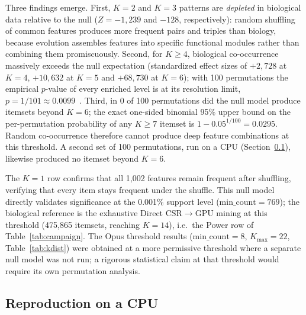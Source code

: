 \documentclass[10pt,a4paper,twocolumn]{article}
\begin{document}
Three findings emerge. First, $K{=}2$ and $K{=}3$ patterns are \emph{depleted} in biological data relative to the null ($Z{=}{-}1{,}239$ and ${-}128$, respectively): random shuffling of common features produces more frequent pairs and triples than biology, because evolution assembles features into specific functional modules rather than combining them promiscuously. Second, for $K{\geq}4$, biological co-occurrence massively exceeds the null expectation (standardized effect sizes of $+2{,}728$ at $K{=}4$, $+10{,}632$ at $K{=}5$ and $+68{,}730$ at $K{=}6$); with 100 permutations the empirical $p$-value of every enriched level is at its resolution limit, $p{=}1/101{\approx}0.0099$~\cite{phipson2010}. Third, in 0 of 100 permutations did the null model produce itemsets beyond $K{=}6$; the exact one-sided binomial 95\% upper bound on the per-permutation probability of any $K{\geq}7$ itemset is $1-0.05^{1/100}{=}0.0295$. Random co-occurrence therefore cannot produce deep feature combinations at this threshold. A second set of 100 permutations, run on a CPU (Section~\ref{sec:cpu-repro}), likewise produced no itemset beyond $K{=}6$.

The $K{=}1$ row confirms that all 1,002 features remain frequent after shuffling, verifying that every item stays frequent under the shuffle. This null model directly validates significance at the 0.001\% support level ($\text{min\_count}{=}769$); the biological reference is the exhaustive Direct CSR$\to$GPU mining at this threshold (475,865 itemsets, reaching $K{=}14$), i.e.\ the Power row of Table~\ref{tab:campaign}. The Opus threshold results ($\text{min\_count}{=}8$, $K_\text{max}{=}22$, Table~\ref{tab:kdist}) were obtained at a more permissive threshold where a separate null model was not run; a rigorous statistical claim at that threshold would require its own permutation analysis.

\subsection{Reproduction on a CPU}
\label{sec:cpu-repro}
\end{document}
